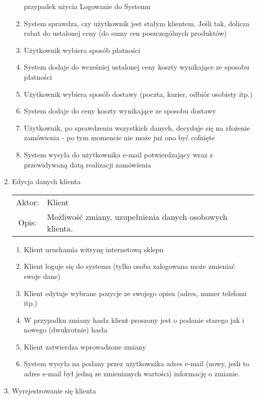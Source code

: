 \begin{enumerate}
\begin{enumerate}
    przypadek użycia Logowanie do Systemu
    \item System sprawdza, czy użytkownik jest stałym klientem. Jeśli tak,
    dolicza rabat do ustalonej ceny (do sumy cen poszczególnych produktów)
    \item Użytkownik wybiera sposób płatności
    \item System dodaje do wcześniej ustalonej ceny koszty wynikające ze sposobu
    płatności
    \item Użytkownik wybiera sposób dostawy (poczta, kurier, odbiór osobisty
    itp.)
    \item System dodaje do ceny koszty wynikające ze sposobu dostawy
    \item Użytkownik, po sprawdzeniu wszystkich danych, decyduje się na złożenie
    zamówienia - po tym momencie nie może już ono być cofnięte
    \item System wysyła do użytkownika e-mail potwierdzający wraz z przewidywaną
    datą realizacji zamówienia
  \end{enumerate} 
  \item Edycja danych klienta \\
  \begin{tabularx}{\linewidth}{ c X }
  Aktor: & Klient \\
  Opis: & Możliwość zmiany, uzupełnienia danych osobowych klienta.\\
  \end{tabularx}
  \begin{enumerate}
    \item Klient uruchamia witrynę internetową sklepu
    \item Klient loguje się do systemu (tylko osoba zalogowana może zmieniać
    swoje dane)
    \item Klient edytuje wybrane pozycje ze swojego opisu (adres, numer
    telefonu itp.)
    \item W przypadku zmiany hasła klient proszony jest o podanie starego jak i
    nowego (dwukrotnie) hasła
    \item Klient zatwierdza wprowadzone zmiany
    \item System wysyła na podany przez użytkownika adres e-mail (nowy, jeśli
    to adres e-mail był jedną ze zmienianych wartości) informację o zmianie.
  \end{enumerate}
  \item Wyrejestrowanie się klienta \\
  \begin{tabularx}{\linewidth}{ c X }

\end{tabularx}
\end{enumerate}
